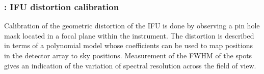 \clearpage
\subsubsection{: IFU distortion calibration}
\label{sssec:ifu_distortion}
\label{rec:metis_ifu_distortion}

Calibration of the geometric distortion of the IFU is done by
observing a pin hole mask located in a focal plane within the
instrument. The distortion is described in terms of a polynomial model
whose coefficients can be used to map positions in the detector
array to sky positions. Measurement of the FWHM of the spots gives an
indication of the variation of spectral resolution across the field of view.


